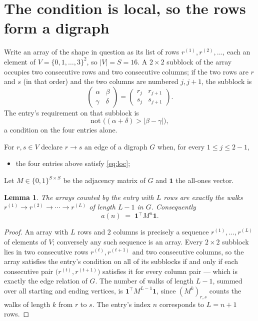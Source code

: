 \documentclass[11pt,a4paper]{article}
\theoremstyle{plain}
\newtheorem{lemma}[theorem]{Lemma}
\theoremstyle{definition}
\begin{document}
\section{The condition is local, so the rows form a digraph}

Write an array of the shape in question as its list of rows
$r^{(1)},r^{(2)},\dots$, each an element of
$V=\{0,1,\dots,3\}^{2}$, so $|V|=S=16$. A $2\times2$ subblock of the array
occupies two consecutive rows and two consecutive columns; if the two rows are $r$
and $s$ (in that order) and the two columns are numbered $j,j+1$,
the subblock is
\[
\begin{pmatrix}\alpha&\beta\\\gamma&\delta\end{pmatrix}=\begin{pmatrix}r_j&r_{j+1}\\s_j&s_{j+1}\end{pmatrix}.
\]
The entry's requirement on that subblock is
\begin{equation}\label{eq:loc}
\text{not }\bigl((\alpha+\delta)>|\beta-\gamma|\bigr),
\end{equation}
a condition on the four entries alone.

For $r,s\in V$ declare $r\to s$ an edge of a digraph $G$ when, for every
$1\le j\le 2-1$,
\begin{itemize}
\item the four entries above satisfy \eqref{eq:loc};

\end{itemize}
Let $M\in\{0,1\}^{S\times S}$ be the adjacency matrix of $G$ and $\mathbf{1}$ the
all-ones vector.

\begin{lemma}\label{lem:walk}
The arrays counted by the entry with $L$ rows are exactly the walks
$r^{(1)}\to r^{(2)}\to\cdots\to r^{(L)}$ of length $L-1$ in $G$. Consequently
\[
a(n)\;=\;\mathbf{1}^{\!\top}M^{n}\mathbf{1} .
\]
\end{lemma}

\begin{proof}
An array with $L$ rows and $2$ columns is precisely a sequence
$r^{(1)},\dots,r^{(L)}$ of elements of $V$; conversely any such sequence is an array.
Every $2\times2$ subblock lies in two consecutive rows $r^{(t)},r^{(t+1)}$ and two
consecutive columns, so the array satisfies the entry's condition on all of its subblocks
if and only if each consecutive pair $\bigl(r^{(t)},r^{(t+1)}\bigr)$ satisfies it for
every column pair --- which is exactly the edge relation of $G$. The number of walks of
length $L-1$, summed over all starting and ending vertices, is
$\mathbf{1}^{\!\top}M^{L-1}\mathbf{1}$, since $(M^{k})_{r,s}$ counts the walks of
length $k$ from $r$ to $s$. The entry's index $n$ corresponds to $L=n+1$ rows.
\end{proof}
\end{document}
